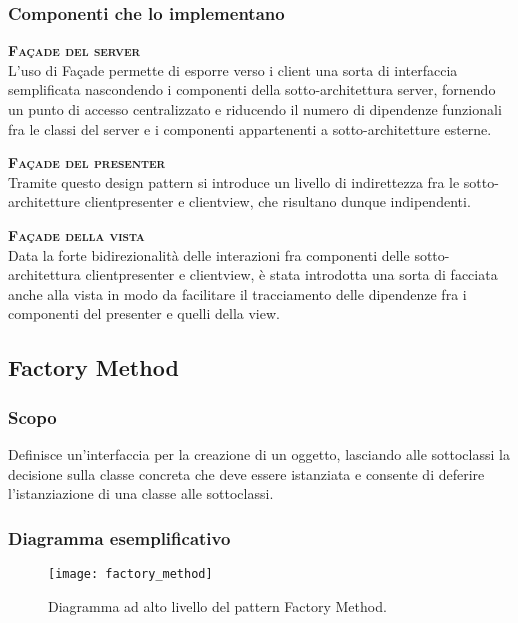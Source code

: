 \subsubsection{Componenti che lo implementano}
\begin{description}
  \item{\scshape\bfseries Façade del server}\\
L'uso di Façade permette di esporre verso i client una sorta di interfaccia semplificata nascondendo i componenti della sotto-architettura server, fornendo un punto di accesso centralizzato e riducendo il numero di dipendenze funzionali fra le classi del server e i componenti appartenenti a sotto-architetture esterne.
  \item{\scshape\bfseries Façade del presenter}\\
Tramite questo design pattern si introduce un livello di indirettezza fra le sotto-architetture clientpresenter e clientview, che risultano dunque indipendenti.
  \item{\scshape\bfseries Façade della vista}\\
Data la forte bidirezionalità delle interazioni fra componenti delle sotto-architettura clientpresenter e clientview, è stata introdotta una sorta di facciata anche alla vista in modo da facilitare il tracciamento delle dipendenze fra i componenti del presenter e quelli della view.
\end{description}

\subsection{Factory Method}

\subsubsection{Scopo}
Definisce un'interfaccia per la creazione di un oggetto, lasciando alle sottoclassi la decisione sulla classe concreta che deve essere istanziata e consente di deferire l'istanziazione di una classe alle sottoclassi.

\subsubsection{Diagramma esemplificativo}
\begin{figure}[h]
\centering
\texttt{[image: factory\_method]}
\caption{Diagramma ad alto livello del pattern Factory Method.}\label{fig:factory_method}
\end{figure}

